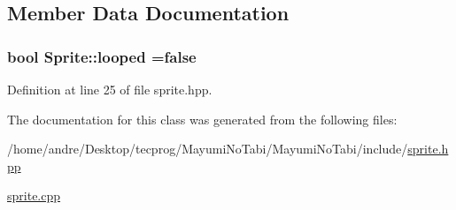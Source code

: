 \subsection{Member Data Documentation}
\hypertarget{class_sprite_a6990b015c0cdf5cece69b14e4de286a4}{
\subsubsection[{looped}]{\setlength{\rightskip}{0pt plus 5cm}bool Sprite\-::looped =false}}\label{class_sprite_a6990b015c0cdf5cece69b14e4de286a4}


Definition at line 25 of file sprite.\-hpp.



The documentation for this class was generated from the following files\-:\begin{DoxyCompactItemize}
\item 
/home/andre/\-Desktop/tecprog/\-Mayumi\-No\-Tabi/\-Mayumi\-No\-Tabi/include/\hyperlink{sprite_8hpp}{sprite.\-hpp}\item 
\hyperlink{sprite_8cpp}{sprite.\-cpp}\end{DoxyCompactItemize}
